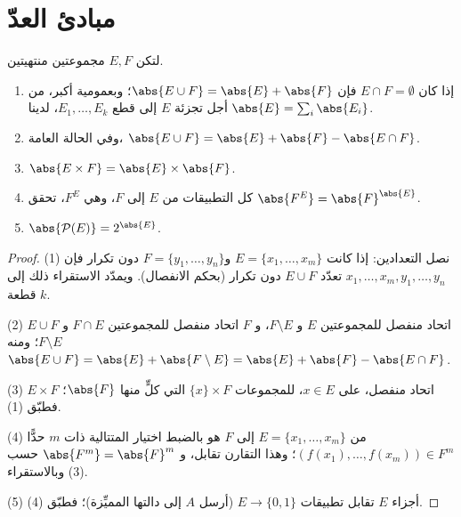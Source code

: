 \section{مبادئ العدّ}

\begin{proposition}\label{prop:b1:counting:rules}
لتكن $E, F$ مجموعتين منتهيتين.
\begin{enumerate}
  \item إذا كان $E \cap F = \emptyset$ فإن $\abs{E \cup F} = \abs{E} +
        \abs{F}$؛ وبعمومية أكبر، من أجل تجزئة $E$ إلى قطع
        $E_1, \dots, E_k$، لدينا $\abs{E} = \sum_i \abs{E_i}$.
  \item وفي الحالة العامة، $\abs{E \cup F} = \abs{E} + \abs{F} - \abs{E \cap
        F}$.
  \item $\abs{E \times F} = \abs{E} \times \abs{F}$.
  \item {} كل التطبيقات من $E$ إلى $F$، وهي $F^E$، تحقق
        $\abs{F^E} = \abs{F}^{\abs{E}}$.
  \item $\abs{\mathcal{P}(E)} = 2^{\abs{E}}$.
\end{enumerate}
\end{proposition}

\begin{proof}
(1) نصل التعدادين: إذا كانت $E = \{x_1, \dots, x_m\}$ و$F =
\{y_1, \dots, y_n\}$ دون تكرار فإن $x_1, \dots, x_m, y_1,
\dots, y_n$ تعدّد $E \cup F$ دون تكرار (بحكم الانفصال).
ويمدّد الاستقراء ذلك إلى $k$ قطعة.

(2)  $E \cup F$ اتحاد منفصل للمجموعتين $E$ و $F \setminus E$، و
$F$ اتحاد منفصل للمجموعتين $F \cap E$ و $F \setminus E$؛ ومنه
$\abs{E \cup F} = \abs{E} + \abs{F \setminus E} = \abs{E} + \abs{F} -
\abs{E \cap F}$.

(3)  $E \times F$ اتحاد منفصل، على $x \in E$، للمجموعات
$\{x\} \times F$ التي  كلٍّ منها $\abs{F}$؛ فطبّق (1).

(4)  من $E = \{x_1, \dots, x_m\}$ إلى $F$ هو بالضبط اختيار
المتتالية  ذات $m$ حدًّا $(f(x_1), \dots, f(x_m)) \in F^m$؛ وهذا
التقارن تقابل، و $\abs{F^m} = \abs{F}^m$ حسب (3)
وبالاستقراء.

(5) أجزاء $E$ تقابل تطبيقات $E \to \{0, 1\}$
(أرسل $A$ إلى دالتها المميِّزة)؛ فطبّق (4).
\end{proof}


